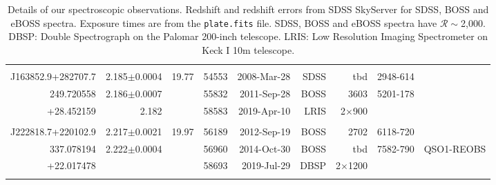 \documentclass[a4paper,fleqn,usenatbib]{mnras}
\begin{document}
\begin{table}
\begin{tabular}{r  r  r r r   r r r r}
                                         &                                       &                          &                &                          &                   &                                &                              & \\
    J163852.9+282707.7   & 2.185$\pm$0.0004       &   19.77              &  54553    & 2008-Mar-28     & SDSS             & tbd                          &  2948-614              & \\
    249.720558	                 &  2.186$\pm$0.0007     &                          &  55832    & 2011-Sep-28     & BOSS            &   3603                  &  5201-178            & \\
    +28.452159                 &  2.182                           &                          &  58583    & 2019-Apr-10      & LRIS              &  2$\times$900    &                              & \\
                                        &                                      &                          &                &                           &                   &                              &                                & \\
    J222818.7+220102.9   & 2.217$\pm$0.0021      & 19.97                &  56189    & 2012-Sep-19      & BOSS             &  2702                 &   6118-720          & \\
    337.078194                 & 2.222$\pm$0.0004      &                          &  56960    & 2014-Oct-30      & BOSS             & tbd                         &   7582-790          & QSO1-REOBS \\ 
    +22.017478                &                                      &                          &  58693    & 2019-Jul-29        & DBSP              & 2$\times$1200  &                           &    \\
                                       &                                       &                          &               &                             &                   &                              &                            & \\
    \hline \hline   
  \end{tabular}
  \caption{
    Details of our spectroscopic observations.
    Redshift and redshift errors from SDSS SkyServer for SDSS, BOSS and eBOSS spectra. 
    Exposure times are from the {\tt plate.fits} file.  SDSS, BOSS and  eBOSS spectra have $\mathcal{R}\sim$2,000.
    DBSP: Double Spectrograph on the Palomar 200-inch telescope.
    LRIS:  Low Resolution Imaging Spectrometer on Keck I 10m telescope.
  } 
  \label{tab:obs_notes}
\end{table}
\end{document}
